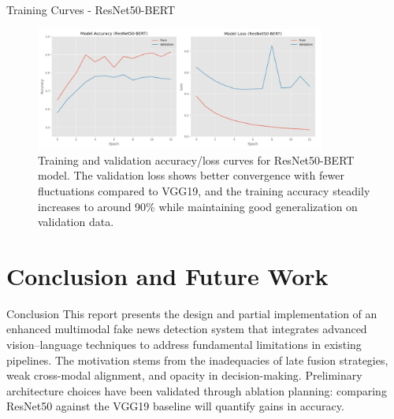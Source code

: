 \documentclass[xcolor=dvipsnames,aspectratio=169]{beamer}
\begin{document}
\begin{frame}{Training Curves - ResNet50-BERT}
\begin{figure}
    \centering
    \includegraphics[width=0.85\textwidth]{resnet50_graph.png}
    \caption{Training and validation accuracy/loss curves for ResNet50-BERT model. The validation loss shows better convergence with fewer fluctuations compared to VGG19, and the training accuracy steadily increases to around 90\% while maintaining good generalization on validation data.}
    \label{fig:resnet50_training}
\end{figure}
\end{frame}

\section{Conclusion and Future Work}
\begin{frame}{Conclusion}
    This report presents the design and partial implementation of an enhanced multimodal fake news detection system that integrates advanced vision–language techniques to address fundamental limitations in existing pipelines. The motivation stems from the inadequacies of late fusion strategies, weak cross-modal alignment, and opacity in decision-making. Preliminary architecture choices have been validated through ablation planning: comparing ResNet50 against the VGG19 baseline will quantify gains in accuracy.
\end{frame}
\end{document}
